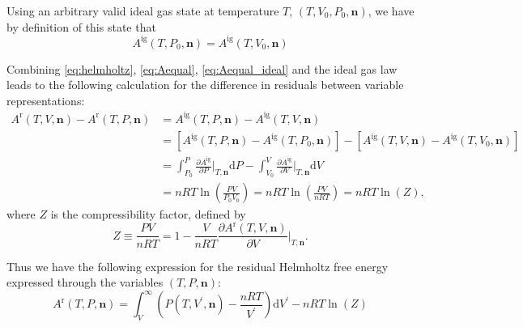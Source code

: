 \documentclass[english]{../thermomemo/thermomemo}
\newcommand{\pone}[3]{\frac{\partial #1}{\partial #2}\bigg|_{#3}}%
\newcommand*{\vektor}[1]{\boldsymbol{#1}}%
\newcommand{\dd}[1]{\mathrm{d}{#1}}
\begin{document}
Using an arbitrary valid ideal gas state at temperature $T$, $(T,V_0,P_0,\vektor{n})$, we 
have by definition of this state that 
\begin{equation}
  A^\text{ig}(T,P_0,\vektor{n}) = A^\text{ig}(T,V_0,\vektor{n})
  \label{eq:Aequal_ideal}
\end{equation}

Combining \eqref{eq:helmholtz}, \eqref{eq:Aequal}, \eqref{eq:Aequal_ideal} and the ideal gas law  
leads to the following calculation 
for the difference in residuals between variable representations:
\begin{align}
  A^\text{r}(T,V,\vektor{n}) - A^\text{r}(T,P,\vektor{n}) 
  &= A^\text{ig}(T,P,\vektor{n}) - A^\text{ig}(T,V,\vektor{n})
  \nonumber \\
  &=\left[A^\text{ig}(T,P,\vektor{n}) - A^\text{ig}(T,P_0,\vektor{n})\right]
  -
  \left[A^\text{ig}(T,V,\vektor{n}) - A^\text{ig}(T,V_0,\vektor{n})\right]
  \nonumber\\
  &=\int_{P_0}^P 
  \pone{A^\text{ig}}{P}{T,\vektor{n}}
  \dd{P}
  -
  \int_{V_0}^V 
  \pone{A^\text{ig}}{V}{T,\vektor{n}}
  \dd{V}
  \nonumber\\
  &= nRT \ln\left( \frac{PV}{P_0 V_0} \right) 
  = nRT \ln\left( \frac{PV}{nRT} \right) 
  = nRT \ln\left( Z \right),
  \label{}
\end{align}
where $Z$ is the compressibility factor, defined by
\begin{equation}
  Z \equiv \frac{PV}{nRT} = 1 - \frac{V}{nRT} \pone{A^\text{r}(T,V,\vektor{n})}{V}{T,\vektor{n}} .
  \label{eq:Z_def}
\end{equation}

Thus we have the following expression for the residual Helmholtz free energy expressed through the 
variables $(T,P,\vektor{n})$:
\begin{equation}
\label{eq:helmholtz_int_TPN}
A^{\text{r}}(T,P,\vektor{n})  = \int_V^\infty \left(P(T,V^\prime,\vektor{n}) - \frac{nRT}{V^\prime}\right) \dd{V^\prime} 
-nRT \ln\left( Z \right)
\end{equation}
\end{document}
